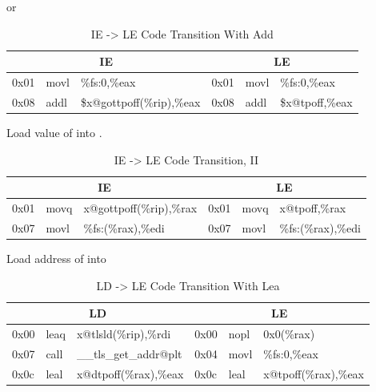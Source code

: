 \begin{description}
or

\begin{table}[H]
\Hrule
\caption{IE -> LE Code Transition With Add}
\begin{center}
\code\small{
\begin{tabular}{lll|lll}
\multicolumn{3}{c}{IE} & \multicolumn{3}{c}{LE} \\
\hline
0x01 & movl & \%fs:0,\%eax		& 0x01 & movl & \%fs:0,\%eax \\
0x08 & addl & \$x@gottpoff(\%rip),\%eax	& 0x08 & addl & \$x@tpoff,\%eax \\
\end{tabular}
}
\end{center}
\Hrule
\end{table}

\item[\textindex{Initial Exec To Local Exec, II}]
  Load value of  into .

\begin{table}[H]
\Hrule
\caption{IE -> LE Code Transition, II}
\begin{center}
\code\small{
\begin{tabular}{lll|lll}
\multicolumn{3}{c}{IE} & \multicolumn{3}{c}{LE} \\
\hline
0x01 & movq & x@gottpoff(\%rip),\%rax	& 0x01 & movq & x@tpoff,\%rax \\
0x07 & movl & \%fs:(\%rax),\%edi	& 0x07 & movl & \%fs:(\%rax),\%edi \\
\end{tabular}
}
\end{center}
\Hrule
\end{table}

\item[\textindex{Local Dynamic to Local Exec}]
  Load address of  into 

\begin{table}[H]
\Hrule
\caption{LD -> LE Code Transition With Lea}
\begin{center}
\code\small{
\begin{tabular}{lll|lll}
\multicolumn{3}{c}{LD} & \multicolumn{3}{c}{LE} \\
\hline
0x00 & leaq  & x@tlsld(\%rip),\%rdi	& 0x00 & nopl & 0x0(\%rax) \\
0x07 & call  & \_\_tls\_get\_addr@plt	& 0x04 & movl & \%fs:0,\%eax\\
0x0c & leal  & x@dtpoff(\%rax),\%eax	& 0x0c & leal & x@tpoff(\%rax),\%eax\\
\end{tabular}
}
\end{center}
\Hrule
\end{table}


\end{description}
